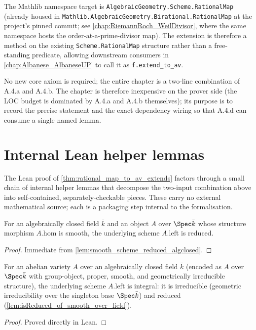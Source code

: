 The Mathlib namespace target is
\texttt{AlgebraicGeometry.Scheme.RationalMap} (already housed in
\texttt{Mathlib.AlgebraicGeometry.Birational.RationalMap} at the project's pinned commit;
see \cref{chap:RiemannRoch_WeilDivisor}, where the same namespace hosts the
order-at-a-prime-divisor map). The extension is therefore a method on the existing
\texttt{Scheme.RationalMap} structure rather than a free-standing predicate, allowing
downstream consumers in \cref{chap:Albanese_AlbaneseUP} to call it as
\texttt{f.extend\_to\_av}.

No new core axiom is required; the entire chapter is a two-line combination of A.4.a and
A.4.b. The chapter is therefore inexpensive on the prover side (the LOC budget is dominated
by A.4.a and A.4.b themselves); its purpose is to record the precise statement and the
exact dependency wiring so that A.4.d can consume a single named lemma.

\section{Internal Lean helper lemmas}
\label{sec:thm32_lean_helpers}

The Lean proof of \cref{thm:rational_map_to_av_extends} factors through a small
chain of internal helper lemmas that decompose the two-input combination above
into self-contained, separately-checkable pieces. These carry no external
mathematical source; each is a packaging step internal to the formalisation.

\begin{lemma}
  \label{lem:isReduced_of_smooth_over_field}
  For an algebraically closed field \(\bar k\) and an object \(A\) over
  \(\Spec \bar k\) whose structure morphism \(A.\mathrm{hom}\) is smooth, the
  underlying scheme \(A.\mathrm{left}\) is reduced.
  \begin{proof}
    Immediate from \cref{lem:smooth_scheme_reduced_algclosed}.
  \end{proof}
\end{lemma}

\begin{lemma}
  \label{lem:av_isIntegral_of_smooth_geomIrred}
  For an abelian variety \(A\) over an algebraically closed field \(\bar k\)
  (encoded as \(A\) over \(\Spec \bar k\) with group-object, proper, smooth, and
  geometrically irreducible structure), the underlying scheme \(A.\mathrm{left}\)
  is integral: it is irreducible (geometric irreducibility over the singleton
  base \(\Spec \bar k\)) and reduced
  (\cref{lem:isReduced_of_smooth_over_field}).
  \begin{proof}
    Proved directly in Lean.
  \end{proof}
\end{lemma}

